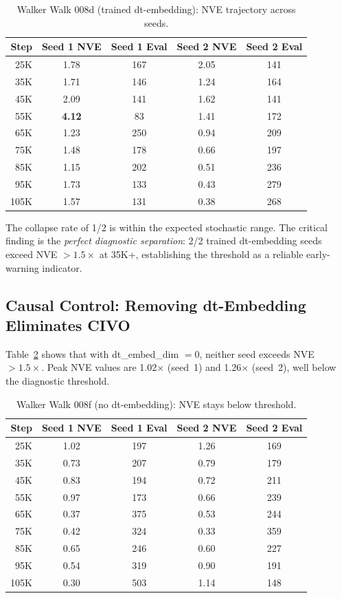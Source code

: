 \documentclass[10pt,letterpaper]{article}
\begin{document}
\begin{table}[h]
\centering
\caption{Walker Walk 008d (trained dt-embedding): NVE trajectory across seeds.}
\label{tab:walker_008d}
\begin{tabular}{rcccc}
\toprule
Step & Seed 1 NVE & Seed 1 Eval & Seed 2 NVE & Seed 2 Eval \\
\midrule
25K  & 1.78 & 167 & 2.05 & 141 \\
35K  & 1.71 & 146 & 1.24 & 164 \\
45K  & 2.09 & 141 & 1.62 & 141 \\
55K  & \textbf{4.12} & 83  & 1.41 & 172 \\
65K  & 1.23 & 250 & 0.94 & 209 \\
75K  & 1.48 & 178 & 0.66 & 197 \\
85K  & 1.15 & 202 & 0.51 & 236 \\
95K  & 1.73 & 133 & 0.43 & 279 \\
105K & 1.57 & 131 & 0.38 & 268 \\
\bottomrule
\end{tabular}
\end{table}

The collapse rate of 1/2 is within the expected stochastic range. The critical finding is the \emph{perfect diagnostic separation}: 2/2 trained dt-embedding seeds exceed NVE $> 1.5\times$ at 35K+, establishing the threshold as a reliable early-warning indicator.

\subsection{Causal Control: Removing dt-Embedding Eliminates CIVO}
\label{sec:walker_causal}

Table~\ref{tab:walker_008f} shows that with dt\_embed\_dim $= 0$, neither seed exceeds NVE $> 1.5\times$. Peak NVE values are 1.02$\times$ (seed~1) and 1.26$\times$ (seed~2), well below the diagnostic threshold.

\begin{table}[h]
\centering
\caption{Walker Walk 008f (no dt-embedding): NVE stays below threshold.}
\label{tab:walker_008f}
\begin{tabular}{rcccc}
\toprule
Step & Seed 1 NVE & Seed 1 Eval & Seed 2 NVE & Seed 2 Eval \\
\midrule
25K  & 1.02 & 197 & 1.26 & 169 \\
35K  & 0.73 & 207 & 0.79 & 179 \\
45K  & 0.83 & 194 & 0.72 & 211 \\
55K  & 0.97 & 173 & 0.66 & 239 \\
65K  & 0.37 & 375 & 0.53 & 244 \\
75K  & 0.42 & 324 & 0.33 & 359 \\
85K  & 0.65 & 246 & 0.60 & 227 \\
95K  & 0.54 & 319 & 0.90 & 191 \\
105K & 0.30 & 503 & 1.14 & 148 \\
\bottomrule
\end{tabular}
\end{table}
\end{document}
